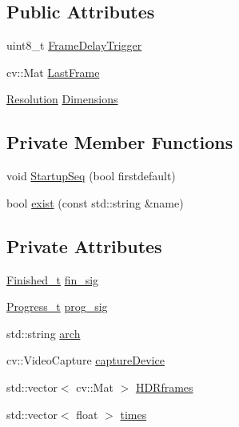 \subsection*{Public Attributes}
\begin{DoxyCompactItemize}
\item 
uint8\+\_\+t \hyperlink{class_hardware_1_1_microscope_ac2da14781a22924a389fc287df3dbfda}{Frame\+Delay\+Trigger}
\item 
cv\+::\+Mat \hyperlink{class_hardware_1_1_microscope_afbbec8a14cd277cec7c3ee6ce0ba54a1}{Last\+Frame}
\item 
\hyperlink{struct_hardware_1_1_microscope_1_1_resolution}{Resolution} \hyperlink{class_hardware_1_1_microscope_ae89c25318a095e2efcdf48fb8f769038}{Dimensions}
\end{DoxyCompactItemize}
\subsection*{Private Member Functions}
\begin{DoxyCompactItemize}
\item 
void \hyperlink{class_hardware_1_1_microscope_ad045b565e258b1b3b68c2c55273b3058}{Startup\+Seq} (bool firstdefault)
\item 
bool \hyperlink{class_hardware_1_1_microscope_a44da9ff8054b51b4659238cc7eda2baf}{exist} (const std\+::string \&name)
\end{DoxyCompactItemize}
\subsection*{Private Attributes}
\begin{DoxyCompactItemize}
\item 
\hyperlink{class_hardware_1_1_microscope_a062b6c7876e05cc311a54bd85da459b2}{Finished\+\_\+t} \hyperlink{class_hardware_1_1_microscope_a8c23e6a55ef77443e861418a15c6e244}{fin\+\_\+sig}
\item 
\hyperlink{class_hardware_1_1_microscope_a5288928044551054276042c402c5a6a1}{Progress\+\_\+t} \hyperlink{class_hardware_1_1_microscope_a819e11c0bfdb12b4c42b7ee2d330cb4d}{prog\+\_\+sig}
\item 
std\+::string \hyperlink{class_hardware_1_1_microscope_a2e74ed11f3426a1a6adf05ec2d842066}{arch}
\item 
cv\+::\+Video\+Capture \hyperlink{class_hardware_1_1_microscope_a8fd921d7c937e808c5bc44c0294aa490}{capture\+Device}
\item 
std\+::vector$<$ cv\+::\+Mat $>$ \hyperlink{class_hardware_1_1_microscope_a2c73db8010320428db3fd41d840dd0eb}{H\+D\+Rframes}
\item 
std\+::vector$<$ float $>$ \hyperlink{class_hardware_1_1_microscope_a5aababdeaa4cc4da051c0e44cba20003}{times}
\end{DoxyCompactItemize}



